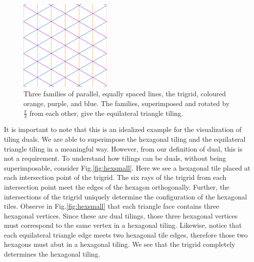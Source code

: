 \documentclass[
  oneside,
  11pt, a4paper,
  footinclude=true,
  headinclude=true,
  cleardoublepage=empty
]{scrbook}
\begin{document}
\begin{figure}[H]
\centering
\includegraphics[width=0.4\textwidth]{TriangleFamilies}
\caption{Three families of parallel, equally spaced lines, the trigrid, coloured orange, purple, and blue. The families, superimposed and rotated by $\frac{\pi}{3}$ from each other, give the equilateral triangle tiling.}
\label{fig:trifam}
\end{figure}

It is important to note that this is an idealized example for the visualization of tiling duals. We are able to superimpose the hexagonal tiling and the equilateral triangle tiling in a meaningful way. However, from our definition of dual, this is not a requirement. To understand how tilings can be duals, without being superimposable, consider Fig.\ref{fig:hexsmall}. Here we see a hexagonal tile placed at each intersection point of the trigrid. The six rays of the trigrid from each intersection point meet the edges of the hexagon orthogonally. Further, the intersections of the trigrid uniquely determine the configuration of the hexagonal tiles. Observe in Fig.\ref{fig:hexsmall} that each triangle face contains three hexagonal vertices. Since these are dual tilings, those three hexagonal vertices must correspond to the same vertex in a hexagonal tiling. Likewise, notice that each equilateral triangle edge meets two hexagonal tile edges, therefore those two hexagons must abut in a hexagonal tiling.  We see that the trigrid completely determines the hexagonal tiling. 
\end{document}

